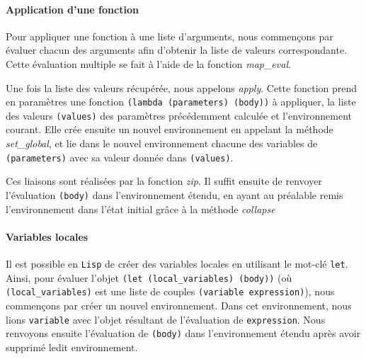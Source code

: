 \paragraph{Application d'une fonction}

Pour appliquer une fonction à une liste d'arguments, nous commençons
par évaluer chacun des arguments afin d'obtenir la liste de valeurs
correspondante. Cette évaluation multiple se fait à l'aide de la
fonction \emph{map\_eval}. 

Une fois la liste des valeurs récupérée, nous appelons
\emph{apply}. Cette fonction prend en paramètres une fonction
\texttt{(lambda (parameters) (body))} à appliquer, la liste des
valeurs \texttt{(values)} des paramètres précédemment calculée et
l'environnement courant. Elle crée ensuite un nouvel environnement en
appelant la méthode \emph{set\_global}, et lie dans le nouvel
environnement chacune des variables de \texttt{(parameters)} avec sa
valeur donnée dans \texttt{(values)}.

Ces liaisons sont réalisées par la fonction \emph{zip}. Il suffit
ensuite de renvoyer l'évaluation \texttt{(body)} dans l'environnement
étendu, en ayant au préalable remis l'environnement dans l'état
initial grâce à la méthode \emph{collapse}

\paragraph{Variables locales}

Il est possible en \texttt{Lisp} de créer des variables locales en
utilisant le mot-clé \texttt{let}. Ainsi, pour évaluer l'objet
\texttt{(let (local\_variables) (body))} (où
\texttt{(local\_variables)} est une liste de couples \texttt{(variable
  expression)}), nous commençons par créer un nouvel environnement.
Dans cet environnement, nous lions \texttt{variable} avec l'objet
résultant de l'évaluation de \texttt{expression}. Nous renvoyons
ensuite l'évaluation de \texttt{(body)} dans l'environnement étendu
après avoir supprimé ledit environnement. 
